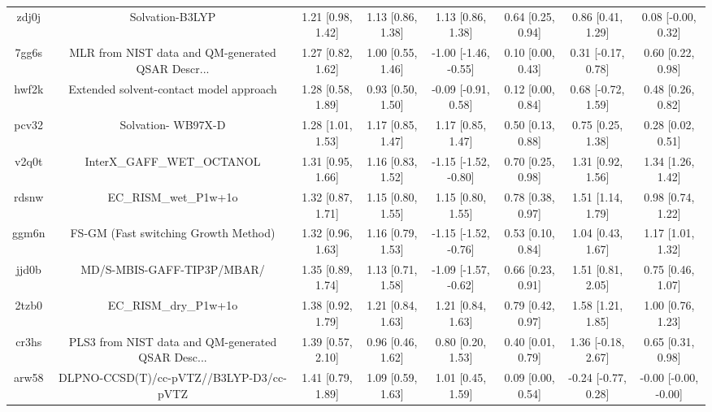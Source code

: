 \documentclass{article}
\begin{document}
\begin{center}
\begin{longtable}{|cccccccc|}
 zdj0j &                                    Solvation-B3LYP &  1.21 [0.98, 1.42] &  1.13 [0.86, 1.38] &     1.13 [0.86, 1.38] &  0.64 [0.25, 0.94] &    0.86 [0.41, 1.29] &    0.08 [-0.00, 0.32] \\
 7gg6s &  MLR from NIST data and QM-generated QSAR Descr... &  1.27 [0.82, 1.62] &  1.00 [0.55, 1.46] &  -1.00 [-1.46, -0.55] &  0.10 [0.00, 0.43] &   0.31 [-0.17, 0.78] &     0.60 [0.22, 0.98] \\
 hwf2k &            Extended solvent-contact model approach &  1.28 [0.58, 1.89] &  0.93 [0.50, 1.50] &   -0.09 [-0.91, 0.58] &  0.12 [0.00, 0.84] &   0.68 [-0.72, 1.59] &     0.48 [0.26, 0.82] \\
 pcv32 &                                 Solvation- WB97X-D &  1.28 [1.01, 1.53] &  1.17 [0.85, 1.47] &     1.17 [0.85, 1.47] &  0.50 [0.13, 0.88] &    0.75 [0.25, 1.38] &     0.28 [0.02, 0.51] \\
 v2q0t &                         InterX\_GAFF\_WET\_OCTANOL &  1.31 [0.95, 1.66] &  1.16 [0.83, 1.52] &  -1.15 [-1.52, -0.80] &  0.70 [0.25, 0.98] &    1.31 [0.92, 1.56] &     1.34 [1.26, 1.42] \\
 rdsnw &                              EC\_RISM\_wet\_P1w+1o &  1.32 [0.87, 1.71] &  1.15 [0.80, 1.55] &     1.15 [0.80, 1.55] &  0.78 [0.38, 0.97] &    1.51 [1.14, 1.79] &     0.98 [0.74, 1.22] \\
 ggm6n &               FS-GM (Fast switching Growth Method) &  1.32 [0.96, 1.63] &  1.16 [0.79, 1.53] &  -1.15 [-1.52, -0.76] &  0.53 [0.10, 0.84] &    1.04 [0.43, 1.67] &     1.17 [1.01, 1.32] \\
 jjd0b &                         MD/S-MBIS-GAFF-TIP3P/MBAR/ &  1.35 [0.89, 1.74] &  1.13 [0.71, 1.58] &  -1.09 [-1.57, -0.62] &  0.66 [0.23, 0.91] &    1.51 [0.81, 2.05] &     0.75 [0.46, 1.07] \\
 2tzb0 &                              EC\_RISM\_dry\_P1w+1o &  1.38 [0.92, 1.79] &  1.21 [0.84, 1.63] &     1.21 [0.84, 1.63] &  0.79 [0.42, 0.97] &    1.58 [1.21, 1.85] &     1.00 [0.76, 1.23] \\
 cr3hs &  PLS3 from NIST data and QM-generated QSAR Desc... &  1.39 [0.57, 2.10] &  0.96 [0.46, 1.62] &     0.80 [0.20, 1.53] &  0.40 [0.01, 0.79] &   1.36 [-0.18, 2.67] &     0.65 [0.31, 0.98] \\
 arw58 &            DLPNO-CCSD(T)/cc-pVTZ//B3LYP-D3/cc-pVTZ &  1.41 [0.79, 1.89] &  1.09 [0.59, 1.63] &     1.01 [0.45, 1.59] &  0.09 [0.00, 0.54] &  -0.24 [-0.77, 0.28] &  -0.00 [-0.00, -0.00] \\

\end{longtable}
\end{center}
\end{document}
